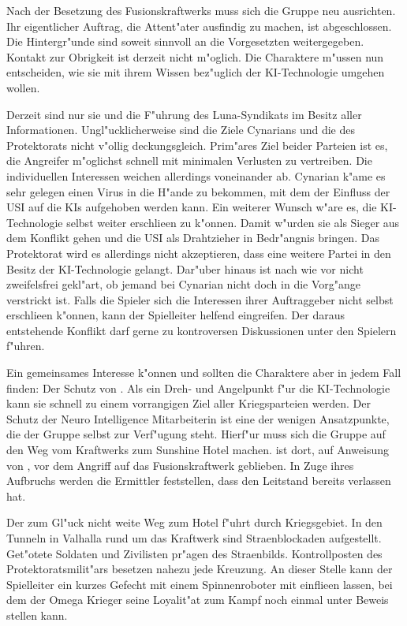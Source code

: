 
Nach der Besetzung des Fusionskraftwerks muss sich die Gruppe neu ausrichten. Ihr eigentlicher Auftrag, die Attent"ater ausfindig zu machen, ist abgeschlossen. Die Hintergr"unde sind soweit sinnvoll an die Vorgesetzten weitergegeben. Kontakt zur Obrigkeit ist derzeit nicht m"oglich. Die Charaktere m"ussen nun entscheiden, wie sie mit ihrem Wissen bez"uglich der KI-Technologie umgehen wollen. 

Derzeit sind nur sie und die F"uhrung des Luna-Syndikats im Besitz aller Informationen. Ungl"ucklicherweise sind die Ziele Cynarians und die des Protektorats nicht v"ollig deckungsgleich. Prim"ares Ziel beider Parteien ist es, die Angreifer m"oglichst schnell mit minimalen Verlusten zu vertreiben. Die individuellen Interessen weichen allerdings voneinander ab. Cynarian k"ame es sehr gelegen einen Virus in die H"ande zu bekommen, mit dem der Einfluss der USI auf die KIs aufgehoben werden kann. Ein weiterer Wunsch w"are es, die KI-Technologie selbst weiter erschlie\3en zu k"onnen. Damit w"urden sie als Sieger aus dem Konflikt gehen und die USI als Drahtzieher in Bedr"angnis bringen. Das Protektorat wird es allerdings nicht akzeptieren, dass eine weitere Partei in den Besitz der KI-Technologie gelangt. Dar"uber hinaus ist nach wie vor nicht zweifelsfrei gekl"art, ob jemand bei Cynarian nicht doch in die Vorg"ange verstrickt ist. Falls die Spieler sich die Interessen ihrer Auftraggeber nicht selbst erschlie\3en k"onnen, kann der Spielleiter helfend eingreifen. Der daraus entstehende Konflikt darf gerne zu kontroversen Diskussionen unter den Spielern f"uhren.

Ein gemeinsames Interesse k"onnen und sollten die Charaktere aber in jedem Fall finden: Der Schutz von \ml{}. Als ein Dreh- und Angelpunkt f"ur die KI-Technologie kann sie schnell zu einem vorrangigen Ziel aller Kriegsparteien werden. Der Schutz der Neuro Intelligence Mitarbeiterin ist eine der wenigen Ansatzpunkte, die der Gruppe selbst zur Verf"ugung steht. Hierf"ur muss sich die Gruppe auf den Weg vom Kraftwerks zum Sunshine Hotel machen. \ml{} ist dort, auf Anweisung von \xl{}, vor dem Angriff auf das Fusionskraftwerk geblieben. In Zuge ihres Aufbruchs werden die Ermittler feststellen, dass \xl{} den Leitstand bereits verlassen hat. 

Der zum Gl"uck nicht weite Weg zum Hotel f"uhrt durch Kriegsgebiet. In den Tunneln in Valhalla rund um das Kraftwerk sind Stra\3enblockaden aufgestellt. Get"otete Soldaten und Zivilisten pr"agen des Stra\3enbilds. Kontrollposten des Protektoratsmilit"ars besetzen nahezu jede Kreuzung. An dieser Stelle kann der Spielleiter ein kurzes Gefecht mit einem Spinnenroboter mit einflie\3en lassen, bei dem der Omega Krieger seine Loyalit"at zum Kampf noch einmal unter Beweis stellen kann.


